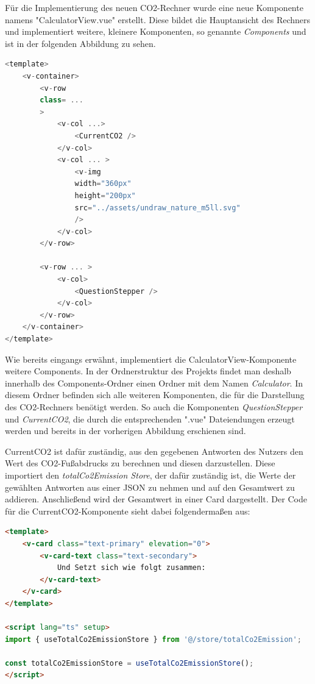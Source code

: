 Für die Implementierung des neuen CO2-Rechner wurde eine neue Komponente namens "CalculatorView.vue" erstellt.
Diese bildet die Hauptansicht des Rechners und implementiert weitere, kleinere Komponenten, so genannte \textit{Components} und ist in der folgenden Abbildung zu sehen.

\begin{lstlisting}[language={JavaScript}, caption={Aufbau der CalculatorView.vue Komponente}]
<template>
    <v-container>
        <v-row
        class= ...
        >
            <v-col ...>
                <CurrentCO2 />
            </v-col>
            <v-col ... >
                <v-img
                width="360px"
                height="200px"
                src="../assets/undraw_nature_m5ll.svg"
                />
            </v-col>
        </v-row>

        <v-row ... >
            <v-col>
                <QuestionStepper />
            </v-col>
        </v-row>
    </v-container>
</template>
\end{lstlisting}

Wie bereits eingangs erwähnt, implementiert die CalculatorView-Komponente weitere Components.
In der Ordnerstruktur des Projekts findet man deshalb innerhalb des Components-Ordner einen Ordner mit dem Namen \textit{Calculator}.
In diesem Ordner befinden sich alle weiteren Komponenten, die für die Darstellung des CO2-Rechners benötigt werden.
So auch die Komponenten \textit{QuestionStepper} und \textit{CurrentCO2}, die durch die entsprechenden ".vue" Dateiendungen erzeugt werden und bereits in der vorherigen Abbildung erschienen sind.

CurrentCO2 ist dafür zuständig, aus den gegebenen Antworten des Nutzers den Wert des CO2-Fußabdrucks zu berechnen und diesen darzustellen.
Diese importiert den \textit{totalCo2Emission Store}, der dafür zuständig ist, die Werte der gewählten Antworten aus einer \acs{JSON} zu nehmen und auf den Gesamtwert zu addieren.
Anschließend wird der Gesamtwert in einer Card dargestellt.
Der Code für die CurrentCO2-Komponente sieht dabei folgendermaßen aus:

\begin{lstlisting}[language={html}, caption={CurrentCO2.vue}]
<template>
    <v-card class="text-primary" elevation="0">
        <v-card-text class="text-secondary">
            Und Setzt sich wie folgt zusammen:
        </v-card-text>
    </v-card>
</template>

<script lang="ts" setup>
import { useTotalCo2EmissionStore } from '@/store/totalCo2Emission';

const totalCo2EmissionStore = useTotalCo2EmissionStore();
</script>
\end{lstlisting}

